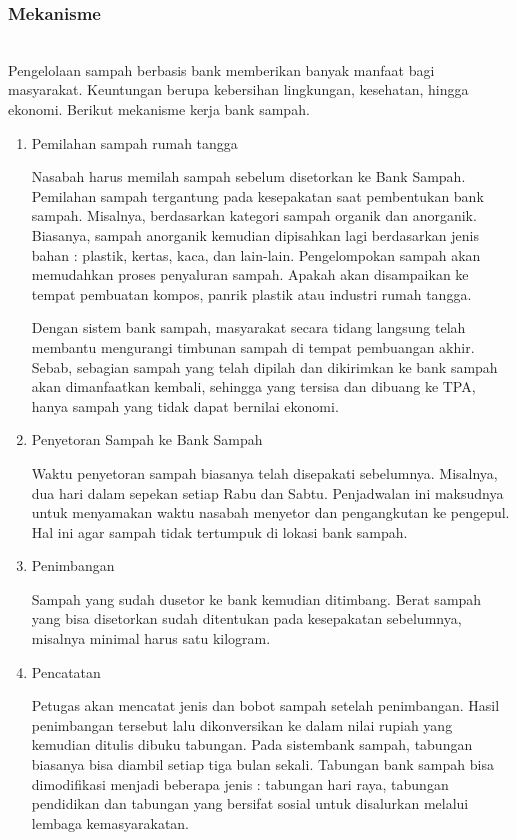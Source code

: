 \subsubsection{Mekanisme}
\hfill\\
Pengelolaan sampah berbasis bank memberikan banyak manfaat bagi masyarakat. Keuntungan berupa kebersihan lingkungan, kesehatan, hingga ekonomi. Berikut mekanisme kerja bank sampah.
\begin{enumerate}
\item Pemilahan sampah rumah tangga

Nasabah harus memilah sampah sebelum disetorkan ke Bank Sampah. Pemilahan sampah tergantung pada kesepakatan saat pembentukan bank sampah. Misalnya, berdasarkan kategori sampah organik dan anorganik. Biasanya, sampah anorganik kemudian dipisahkan lagi berdasarkan jenis bahan : plastik, kertas, kaca, dan lain-lain. Pengelompokan sampah akan memudahkan proses penyaluran sampah. Apakah akan disampaikan ke tempat pembuatan kompos, panrik plastik atau industri rumah tangga.

Dengan sistem bank sampah, masyarakat secara tidang langsung telah membantu mengurangi timbunan sampah di tempat pembuangan akhir. Sebab, sebagian sampah yang telah dipilah dan dikirimkan ke bank sampah akan dimanfaatkan kembali, sehingga yang tersisa dan dibuang ke TPA, hanya sampah yang tidak dapat bernilai ekonomi.

\item Penyetoran Sampah ke Bank Sampah

Waktu penyetoran sampah biasanya telah disepakati sebelumnya. Misalnya, dua hari dalam sepekan setiap Rabu dan Sabtu. Penjadwalan ini maksudnya untuk menyamakan waktu nasabah menyetor dan pengangkutan ke pengepul. Hal ini agar sampah tidak tertumpuk di lokasi bank sampah.

\item Penimbangan

Sampah yang sudah dusetor ke bank kemudian ditimbang. Berat sampah yang bisa disetorkan sudah ditentukan pada kesepakatan sebelumnya, misalnya minimal harus satu kilogram.

\item Pencatatan

Petugas akan mencatat jenis dan bobot sampah setelah penimbangan. Hasil penimbangan tersebut lalu dikonversikan ke dalam nilai rupiah yang kemudian ditulis dibuku tabungan. Pada sistembank sampah, tabungan biasanya bisa diambil setiap tiga bulan sekali. Tabungan bank sampah bisa dimodifikasi menjadi beberapa jenis : tabungan hari raya, tabungan pendidikan dan tabungan yang bersifat sosial untuk disalurkan melalui lembaga kemasyarakatan. 


\end{enumerate}
